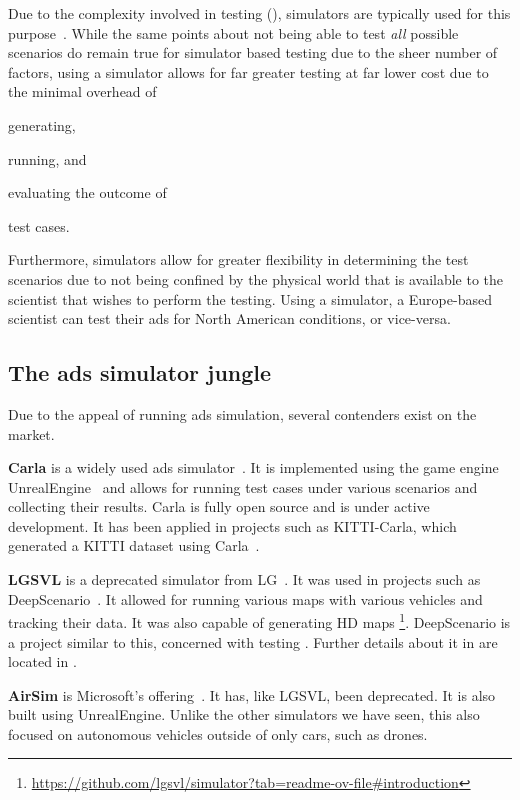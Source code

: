 Due to the complexity involved in testing  (),
simulators are typically used for this purpose~\cite{DeepScenario}. While the same points about not
being able to test \textit{all} possible scenarios do remain true for simulator based testing due to
the sheer number of factors, using a simulator allows for far greater testing at far lower cost due
to the minimal overhead of
\begin{inparaenum}
    \item generating,
    \item running, and
    \item evaluating the outcome of
\end{inparaenum}
test cases.

Furthermore, simulators allow for greater flexibility in determining the test scenarios due to not
being confined by the  physical world that is available to the scientist that wishes to perform the
testing. Using a simulator, a Europe-based scientist can test their \acrshort{ads} for North
American conditions, or vice-versa.

\subsection{The \acrshort{ads} simulator jungle}\label{sec:simulatorOverview}

Due to the appeal of running \acrshort{ads} simulation, several contenders exist
on the market.

\textbf{Carla} is a widely used \acrshort{ads} simulator~\cite{Carla}. It is implemented
using the game engine UnrealEngine~\cite{unrealengine} and allows for running
test cases under various scenarios and collecting their results. Carla is fully
open source and is under active development. It has been applied in projects such as KITTI-Carla,
which generated a KITTI dataset using Carla~\cite{kittiCarla}.

\textbf{LGSVL} is a deprecated simulator from LG~\cite{lgsvl}. It was used in projects such
as DeepScenario~\cite{DeepScenario}. It allowed for running various maps with various vehicles and
tracking their data. It was also capable of generating HD
maps \footnote{\url{https://github.com/lgsvl/simulator?tab=readme-ov-file\#introduction}}.
DeepScenario is a project similar to this, concerned with testing . Further details
about it in are located in .

\textbf{AirSim} is Microsoft's offering~\cite{airsim}. It has, like LGSVL,
been deprecated. It is also built using UnrealEngine. Unlike the other
simulators we have seen, this also focused on autonomous vehicles outside of
only cars, such as drones.


